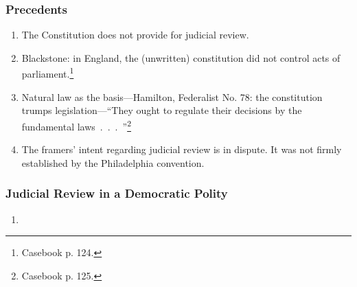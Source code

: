 \subsubsection{Precedents}

\begin{enumerate}
    \item The Constitution does not provide for judicial review.
    \item Blackstone: in England, the (unwritten) constitution did not control 
    acts of parliament.\footnote{Casebook p. 124.}
    \item Natural law as the basis---Hamilton, Federalist No. 78: the 
    constitution trumps legislation---``They ought to regulate their decisions 
    by the fundamental laws~.~.~.~''\footnote{Casebook p. 125.}
    \item The framers' intent regarding judicial review is in dispute. It was 
    not firmly established by the Philadelphia convention.
\end{enumerate}

\subsubsection{Judicial Review in a Democratic Polity}

\begin{enumerate}
    \item %
\end{enumerate}
